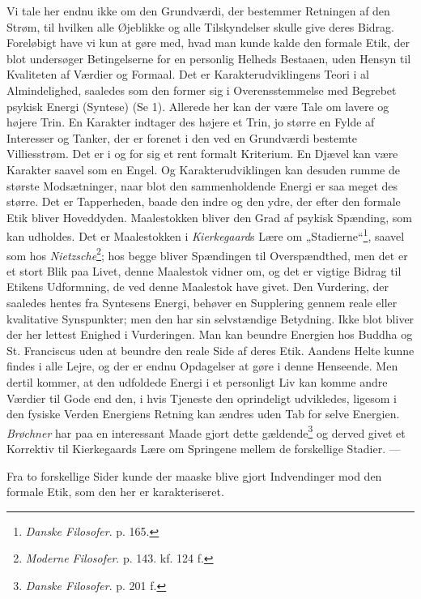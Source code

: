 \documentclass[12pt,a4paper]{book}
\newcommand{\apage}[1]{\marginnote{\footnotesize\textit{[#1]}}}
\begin{document}
Vi tale her endnu ikke om den Grundværdi, der bestemmer Retningen af den Strøm, til hvilken
alle Øjeblikke og alle Tilskyndelser skulle give deres Bidrag. Foreløbigt have vi kun at
gøre med, hvad man kunde kalde den formale Etik, der blot undersøger Betingelserne for en
personlig Helheds Bestaaen, uden Hensyn til Kvaliteten af Værdier og Formaal. Det er
Karakterudviklingens Teori i al Almindelighed, saaledes som den former sig i
Overensstemmelse med Begrebet psykisk Energi (Syntese) (Se 1). Allerede her kan der være
Tale om lavere og højere Trin. En Karakter indtager des højere et Trin, jo større en Fylde
af Interesser og Tanker, der er forenet i den ved en \apage{353} Grundværdi bestemte Villiesstrøm. Det
er i og for sig et rent formalt Kriterium. En Djævel kan være Karakter saavel som en Engel.
Og Karakterudviklingen kan desuden rumme de største Modsætninger, naar blot den
sammenholdende Energi er saa meget des større. Det er Tapperheden, baade den indre og den
ydre, der efter den formale Etik bliver Hoveddyden. Maalestokken bliver den Grad af psykisk
Spænding, som kan udholdes. Det er Maalestokken i \emph{Kierkegaard}s Lære om
„Stadierne“\footnote{\emph{Danske Filosofer}. p. 165.}, saavel som hos
\emph{Nietzsche}\footnote{\emph{Moderne Filosofer}. p. 143. kf. 124 f.}; hos begge bliver
Spændingen til Overspændthed, men det er et stort Blik paa Livet, denne Maalestok vidner
om, og det er vigtige Bidrag til Etikens Udformning, de ved denne Maalestok have givet. Den
Vurdering, der saaledes hentes fra Syntesens Energi, behøver en Supplering gennem reale
eller kvalitative Synspunkter; men den har sin selvstændige Betydning. Ikke blot bliver der
her lettest Enighed i Vurderingen. Man kan beundre Energien hos Buddha og St. Franciscus
uden at beundre den reale Side af deres Etik. Aandens Helte kunne findes i alle Lejre, og
der er endnu Opdagelser at gøre i denne Henseende. Men dertil kommer, at den udfoldede
Energi i et personligt Liv kan komme andre Værdier til Gode end den, i hvis Tjeneste den
oprindeligt udvikledes, ligesom i den fysiske Verden Energiens Retning kan ændres uden Tab
for selve Energien. \emph{Brøchner} har paa en interessant Maade gjort dette
gældende\footnote{\emph{Danske Filosofer}. p. 201 f.} og derved givet et Korrektiv til
Kierkegaards Lære om Springene mellem de forskellige Stadier. ---

Fra to forskellige Sider kunde der maaske blive gjort Indvendinger mod den formale Etik,
som den her er karakteriseret.
\end{document}
